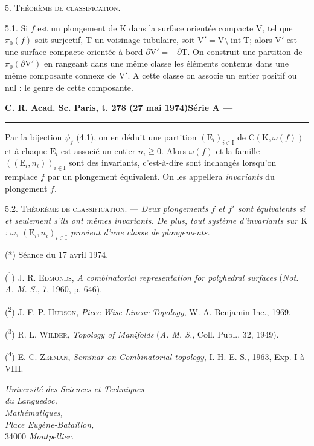 5. \textsc{Théorème de classification.}

5.1. Si \(f\) est un plongement de \(\mathrm{K}\) dans la surface orientée compacte \(\mathrm{V}\), tel que \(\pi_0(f)\) soit surjectif, \(\mathrm{T}\) un voisinage tubulaire, soit \(\mathrm{V}'=\mathrm{V}\setminus\operatorname{int}\mathrm{T}\); alors \(\mathrm{V}'\) est une surface compacte orientée à bord \(\partial\mathrm{V}'=-\partial\mathrm{T}\). On construit une partition de \(\pi_0(\partial\mathrm{V}')\) en rangeant dans une même classe les éléments contenus dans une même composante connexe de \(\mathrm{V}'\). A cette classe on associe un entier positif ou nul : le genre de cette composante.

\textbf{C. R. Acad. Sc. Paris, t. 278 (27 mai 1974)}\hfill\textbf{Série A ---}\par\noindent\rule{\linewidth}{.35pt}\par

Par la bijection \(\psi_f\) (4.1), on en déduit une partition \((\mathrm{E}_i)_{i\in\mathrm{I}}\) de \(\mathrm{C}(\mathrm{K},\omega(f))\) et à chaque \(\mathrm{E}_i\) est associé un entier \(n_i\geqq0\). Alors \(\omega(f)\) et la famille \(((\mathrm{E}_i,n_i))_{i\in\mathrm{I}}\) sont des invariants, c'est-à-dire sont inchangés lorsqu'on remplace \(f\) par un plongement équivalent. On les appellera \textit{invariants} du plongement \(f\).

5.2. \textsc{Théorème de classification.} --- \textit{Deux plongements \(f\) et \(f'\) sont équivalents si et seulement s'ils ont mêmes invariants. De plus, tout système d'invariants sur \(\mathrm{K}\) : \(\omega,\ (\mathrm{E}_i,n_i)_{i\in\mathrm{I}}\) provient d'une classe de plongements.}

{\small (*) Séance du 17 avril 1974.

(\textsuperscript{1}) J. R. \textsc{Edmonds}, \textit{A combinatorial representation for polyhedral surfaces} (\textit{Not. A. M. S.}, 7, 1960, p. 646).

(\textsuperscript{2}) J. F. P. \textsc{Hudson}, \textit{Piece-Wise Linear Topology}, W. A. Benjamin Inc., 1969.

(\textsuperscript{3}) R. L. \textsc{Wilder}, \textit{Topology of Manifolds} (\textit{A. M. S.}, Coll. Publ., 32, 1949).

(\textsuperscript{4}) E. C. \textsc{Zeeman}, \textit{Seminar on Combinatorial topology}, I. H. E. S., 1963, Exp. I à VIII.}

\begin{flushright}
\textit{Université des Sciences et Techniques}\\
\textit{du Languedoc,}\\
\textit{Mathématiques,}\\
\textit{Place Eugène-Bataillon,}\\
34000 \textit{Montpellier.}
\end{flushright}

